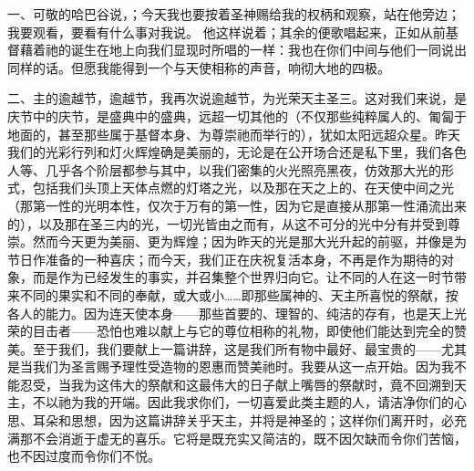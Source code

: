 一、可敬的哈巴谷说，；今天我也要按着圣神赐给我的权柄和观察，站在他旁边；我要观看，要看有什么事对我说。    他这样说着；其余的便歌唱起来，正如从前基督藉着祂的诞生在地上向我们显现时所唱的一样：我也在你们中间与他们一同说出同样的话。但愿我能得到一个与天使相称的声音，响彻大地的四极。\par

二、主的逾越节，逾越节，我再次说逾越节，为光荣天主圣三。这对我们来说，是庆节中的庆节，是盛典中的盛典，远超一切其他的（不仅那些纯粹属人的、匍匐于地面的，甚至那些属于基督本身、为尊崇祂而举行的），犹如太阳远超众星。昨天我们的光彩行列和灯火辉煌确是美丽的，无论是在公开场合还是私下里，我们各色人等、几乎各个阶层都参与其中，以我们密集的火光照亮黑夜，仿效那大光的形式，包括我们头顶上天体点燃的灯塔之光，以及那在天之上的、在天使中间之光（那第一性的光明本性，仅次于万有的第一性，因为它是直接从那第一性涌流出来的），以及那在圣三内的光，一切光皆由之而有，从这不可分的光中分有并受到尊崇。然而今天更为美丽、更为辉煌；因为昨天的光是那大光升起的前驱，并像是为节日作准备的一种喜庆；而今天，我们正在庆祝复活本身，不再是作为期待的对象，而是作为已经发生的事实，并召集整个世界归向它。让不同的人在这一时节带来不同的果实和不同的奉献，或大或小……即那些属神的、天主所喜悦的祭献，按各人的能力。因为连天使本身——那些首要的、理智的、纯洁的存有，也是天上光荣的目击者——恐怕也难以献上与它的尊位相称的礼物，即使他们能达到完全的赞美。至于我们，我们要献上一篇讲辞，这是我们所有物中最好、最宝贵的——尤其是当我们为圣言赐予理性受造物的恩惠而赞美祂时。我要从这一点开始。因为我不能忍受，当我为这伟大的祭献和这最伟大的日子献上嘴唇的祭献时，竟不回溯到天主，不以祂为我的开端。因此我求你们，一切喜爱此类主题的人，请洁净你们的心思、耳朵和思想，因为这篇讲辞关乎天主，并将是神圣的；这样你们离开时，必充满那不会消逝于虚无的喜乐。它将是既充实又简洁的，既不因欠缺而令你们苦恼，也不因过度而令你们不悦。\par

